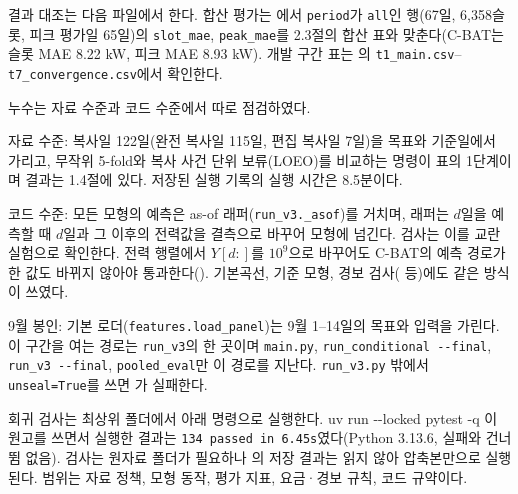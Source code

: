 결과 대조는 다음 파일에서 한다. 합산 평가는 에서 \texttt{period}가 \texttt{all}인 행(67일, 6,358슬롯, 피크 평가일 65일)의 \texttt{slot\_mae}, \texttt{peak\_mae}를 2.3절의 합산 표와 맞춘다(C-BAT는 슬롯 MAE 8.22 kW, 피크 MAE 8.93 kW). 개발 구간 표는 의 \texttt{t1\_main.csv}--\texttt{t7\_convergence.csv}에서 확인한다.


누수는 자료 수준과 코드 수준에서 따로 점검하였다.
\begin{hwplist}
\item 자료 수준: 복사일 122일(완전 복사일 115일, 편집 복사일 7일)을 목표와 기준일에서 가리고, 무작위 5-fold와 복사 사건 단위 보류(LOEO)를 비교하는 명령이 표의 1단계이며 결과는 1.4절에 있다. 저장된 실행 기록의 실행 시간은 8.5분이다.
\item 코드 수준: 모든 모형의 예측은 as-of 래퍼(\texttt{run\_v3.\_asof})를 거치며, 래퍼는 $d$일을 예측할 때 $d$일과 그 이후의 전력값을 결측으로 바꾸어 모형에 넘긴다. 검사는 이를 교란 실험으로 확인한다. 전력 행렬에서 $Y[d{:}]$를 $10^9$으로 바꾸어도 C-BAT의 예측 경로가 한 값도 바뀌지 않아야 통과한다(). 기본곡선, 기준 모형, 경보 검사( 등)에도 같은 방식이 쓰였다.
\item 9월 봉인: 기본 로더(\texttt{features.load\_panel})는 9월 1--14일의 목표와 입력을 가린다. 이 구간을 여는 경로는 \texttt{run\_v3}의 한 곳이며 \texttt{main.py}, \texttt{run\_conditional -{}-final}, \texttt{run\_v3 -{}-final}, \texttt{pooled\_eval}만 이 경로를 지난다. \texttt{run\_v3.py} 밖에서 \texttt{unseal=True}를 쓰면 가 실패한다.
\end{hwplist}
회귀 검사는 최상위 폴더에서 아래 명령으로 실행한다.
\sixopen uv run -{}-locked pytest -q\sixclose
이 원고를 쓰면서 실행한 결과는 \texttt{134 passed in 6.45s}였다(Python 3.13.6, 실패와 건너뜀 없음). 검사는 원자료 폴더가 필요하나 의 저장 결과는 읽지 않아 압축본만으로 실행된다. 범위는 자료 정책, 모형 동작, 평가 지표, 요금·경보 규칙, 코드 규약이다.


